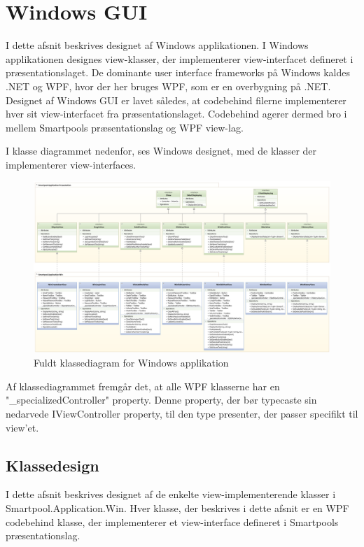 \section{Windows GUI}
I dette afsnit beskrives designet af Windows applikationen. I Windows applikationen designes view-klasser, der implementerer view-interfacet defineret i præsentationslaget. De dominante user interface frameworks på Windows kaldes .NET og WPF, hvor der her bruges WPF, som er en overbygning på .NET. 
Designet af Windows GUI er lavet således, at codebehind filerne implementerer hver sit view-interfacet fra præsentationslaget.
Codebehind agerer dermed bro i mellem Smartpools præsentationslag og WPF view-lag.

I klasse diagrammet nedenfor, ses Windows designet, med de klasser der implementerer view-interfaces.
\begin{landscape}
\begin{figure}
\centering
\includegraphics[width=1\linewidth]{figs/design/win_uml_full}
\caption{Fuldt klassediagram for Windows applikation}
\label{fig:win_uml_full}
\end{figure}
\end{landscape}

Af klassediagrammet fremgår det, at alle WPF klasserne har en "\_specializedController" property. Denne property, der bør typecaste sin nedarvede IViewController property, til den type presenter, der passer specifikt til view'et.

\subsection{Klassedesign}
I dette afsnit beskrives designet af de enkelte view-implementerende klasser i Smartpool.Application.Win. Hver klasse, der beskrives i dette afsnit er en WPF codebehind klasse, der implementerer et view-interface defineret i Smartpools præsentationslag.

